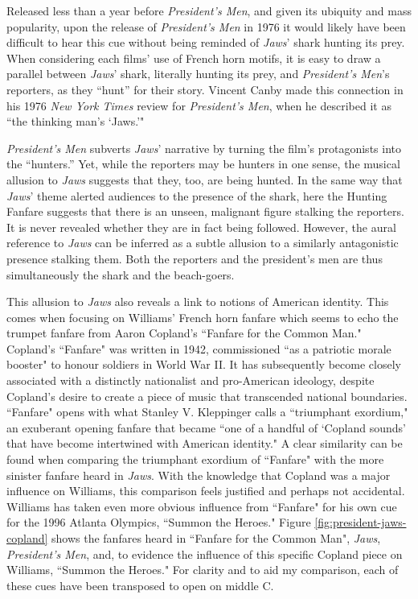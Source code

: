 Released less than a year before \textit{President’s Men}, and given its ubiquity and mass popularity, upon the release of \textit{President’s Men }in 1976 it would likely have been difficult to hear this cue without being reminded of \textit{Jaws}’ shark hunting its prey.
When considering each films’ use of French horn motifs, it is easy to draw a parallel between \textit{Jaws}’ shark, literally hunting its prey, and \textit{President’s Men}’s reporters, as they ``hunt” for their story.
Vincent Canby made this connection in his 1976 \textit{New York Times} review for \textit{President’s Men}, when he described it as ``the thinking man’s `Jaws.’"\autocites[][]{canby_presidents_1976}

\textit{President’s Men} subverts \textit{Jaws}’ narrative by turning the film's protagonists into the ``hunters.”
Yet, while the reporters may be hunters in one sense, the musical allusion to \textit{Jaws} suggests that they, too, are being hunted.
In the same way that \textit{Jaws}’ theme alerted audiences to the presence of the shark, here the Hunting Fanfare suggests that there is an unseen, malignant figure stalking the reporters.
It is never revealed whether they are in fact being followed.
However, the aural reference to \textit{Jaws} can be inferred as a subtle allusion to a similarly antagonistic presence stalking them.
Both the reporters and the president’s men are thus simultaneously the shark and the beach-goers.

This allusion to \textit{Jaws} also reveals a link to notions of American identity.
This comes when focusing on Williams' French horn fanfare which seems to echo the trumpet fanfare from Aaron Copland's ``Fanfare for the Common Man."
Copland's ``Fanfare" was written in 1942, commissioned ``as a patriotic morale booster" to honour soldiers in World War II.\autocites[][5]{pollack_copland_2005}
It has subsequently become closely associated with a distinctly nationalist and pro-American ideology, despite Copland's desire to create a piece of music that transcended national boundaries.
``Fanfare" opens with what Stanley V. Kleppinger calls a ``triumphant exordium," an exuberant opening fanfare that became ``one of a handful of `Copland sounds' that have become intertwined with American identity."
A clear similarity can be found when comparing the triumphant exordium of ``Fanfare" with the more sinister fanfare heard in \textit{Jaws}.
With the knowledge that Copland was a major influence on Williams, this comparison feels justified and perhaps not accidental.\autocites[Emilio Audissino discusses the influence of Copland on Williams, claiming that ``Williams was also influenced by Copland's Americana dialect–pandiatonicism and quartel harmony–especially in his American themes."][139]{audissino_film_2021}
Williams has taken even more obvious influence from ``Fanfare" for his own cue for the 1996 Atlanta Olympics, ``Summon the Heroes."
Figure \ref{fig:president-jaws-copland} shows the fanfares heard in ``Fanfare for the Common Man", \textit{Jaws}, \textit{President's Men}, and, to evidence the influence of this specific Copland piece on Williams, ``Summon the Heroes."
For clarity and to aid my comparison, each of these cues have been transposed to open on middle C.

